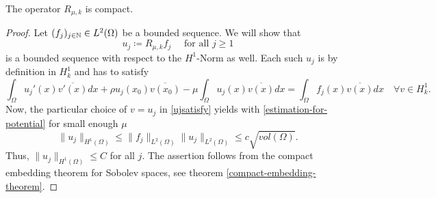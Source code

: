 \begin{theorem} \label{3.1:thm-Rmuk.isCompact}
	The operator $R_{\mu, k}$ is compact.

	\begin{proof}
	Let $(f_{j})_{j \in \mathbb{N}} \in L^{2}(\Omega)$ be a  bounded sequence. We will show that 
		\[ u_{j} \coloneqq R_{\mu, k} f_{j} \quad \text{ for all } j \geq 1 \]
	is a bounded sequence with respect to the $H^{1}$-Norm as well. Each such $u_{j}$ is by definition in $H^{1}_{k}$ and has to satisfy
		\begin{equation}
			\int_{\Omega} u_{j}'(x) \overline{v'(x)} dx + \rho u_{j}(x_{0}) \overline{v(x_{0})} - \mu \int_{\Omega} u_{j}(x) \overline{v(x)} dx = \int_{\Omega} f_{j}(x) \overline{v(x)} dx \quad \forall v \in H^{1}_{k}. \label{ujsatisfy}
		\end{equation} 
	Now, the particular choice of $v = u_{j}$ in \eqref{ujsatisfy} yields with \eqref{estimation-for-potential} for small enough $\mu$
		\[  \| u_{j} \|_{H^{1}(\Omega)} \leq \| f_{j} \|_{L^{2}(\Omega)} \| u_{j} \|_{L^{2}(\Omega)} \leq c \sqrt{vol(\Omega)}. \]
	Thus, $\| u_{j} \|_{H^{1}(\Omega)} \leq C$ for all $j$. The assertion follows from the compact embedding theorem for Sobolev spaces, see theorem \ref{compact-embedding-theorem}.
	\end{proof}	
\end{theorem}		

